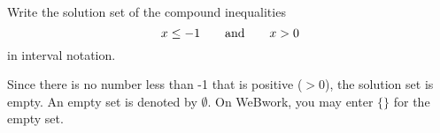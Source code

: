 

Write the solution set of the compound inequalities
\[x \leq -1\text{\quad\quad and\quad\quad} x >0 \]
in interval notation.

\begin{solution}
	Since there is no number less than -1 that is positive ($>0$), the solution set is empty. An empty set is denoted by $\emptyset$. On WeBwork, you may enter $\{\}$ for the empty set.
\end{solution}